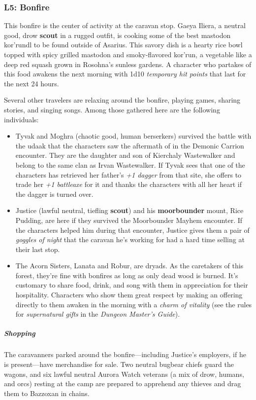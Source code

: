 \documentclass[10pt,a4paper,twoside,fancy,bg=print,twocolumn,openany,nodeprecatedcode]{dndbook}
\begin{document}
\subsubsection{L5: Bonfire}
This bonfire is the center of activity at the caravan stop. Gaeya Iliera, a neutral good, drow \textbf{scout} in a rugged outfit, is cooking some of the best mastodon kor'rundl to be found outside of Asarius. This savory dish is a hearty rice bowl topped with spicy grilled mastodon and smoky-flavored kor'run, a vegetable like a deep red squash grown in Rosohna's sunless gardens. A character who partakes of this food awakens the next morning with 1d10 \textit{temporary hit points} that last for the next 24 hours.

Several other travelers are relaxing around the bonfire, playing games, sharing stories, and singing songs. Among those gathered here are the following individuals:


\begin{itemize}
\item Tyvak and Moghra (chaotic good, human berserkers) survived the battle with the udaak that the characters saw the aftermath of in the Demonic Carrion encounter. They are the daughter and son of Kierchaly Wastewalker and belong to the same clan as Irvan Wastewalker. If Tyvak sees that one of the characters has retrieved her father's \textit{+1 dagger} from that site, she offers to trade her \textit{+1 battleaxe} for it and thanks the characters with all her heart if the dagger is turned over.
\item Justice (lawful neutral, tiefling \textbf{scout}) and his \textbf{moorbounder} mount, Rice Pudding, are here if they survived the Moorbounder Mayhem encounter. If the characters helped him during that encounter, Justice gives them a pair of \textit{goggles of night} that the caravan he's working for had a hard time selling at their last stop.
\item The Acorn Sisters, Lanata and Robur, are dryads. As the caretakers of this forest, they're fine with bonfires as long as only dead wood is burned. It's customary to share food, drink, and song with them in appreciation for their hospitality. Characters who show them great respect by making an offering directly to them awaken in the morning with a \textit{charm of vitality} (see the rules for \textit{supernatural gifts} in the \textit{Dungeon Master's Guide}).
\end{itemize}

\subparagraph{Shopping}
The caravanners parked around the bonfire—including Justice's employers, if he is present—have merchandise for sale. Two neutral bugbear chiefs guard the wagons, and six lawful neutral Aurora Watch veterans (a mix of drow, humans, and orcs) resting at the camp are prepared to apprehend any thieves and drag them to Bazzoxan in chains.
\end{document}
